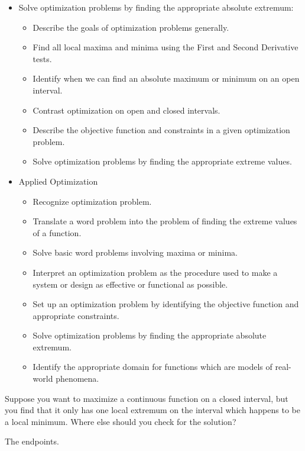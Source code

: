 \documentclass[handout,nooutcomes]{ximera}
\renewenvironment{freeResponse}{
\ifhandout\setbox0\vbox\bgroup\else
\begin{trivlist}\item[\hskip \labelsep\bfseries Solution:\hspace{2ex}]
\fi}
{\ifhandout\egroup\else
\end{trivlist}
\fi}
\begin{document}
\begin{itemize}
\item
  Solve optimization problems by finding the appropriate absolute extremum:
  \begin{itemize}
  \item
    Describe the goals of optimization problems generally.
  \item 
    Find all local maxima and minima using the First and Second Derivative tests.
  \item
    Identify when we can find an absolute maximum or minimum on an open interval.
  \item
    Contrast optimization on open and closed intervals.
  \item
    Describe the objective function and constraints in a given optimization problem.
  \item
    Solve optimization problems by finding the appropriate extreme values.
  \end{itemize}

\item
  Applied Optimization
  \begin{itemize}
  \item 
    Recognize optimization problem.
  \item 
    Translate a word problem into the problem of finding the extreme values of a function.
  \item
    Solve basic word problems involving maxima or minima.
  \item
    Interpret an optimization problem as the procedure used to make a system or design as effective or functional as possible.
  \item
    Set up an optimization problem by identifying the objective function and appropriate constraints.
  \item
    Solve optimization problems by finding the appropriate absolute extremum.
  \item 
    Identify the appropriate domain for functions which are models of real-world phenomena.
  \end{itemize}
\end{itemize}

\begin{problem}
  Suppose you want to maximize a continuous function on a closed interval, but you find that it only has one local extremum on the  interval which happens to be a local minimum.
  Where else should you check for the solution?
\begin{freeResponse}
  The endpoints.
\end{freeResponse}	
\end{problem}
\end{document}

